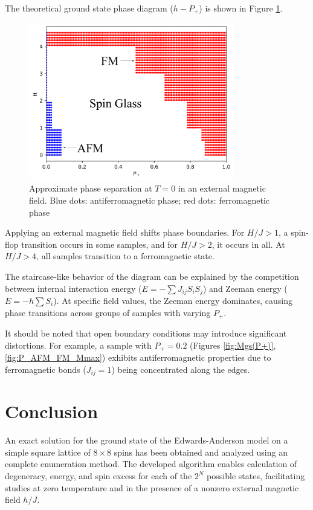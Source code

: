 \documentclass[utf8, babel, sor, jor, amsmath, amssymb, reprint]{elsarticle} %
\begin{document}
The theoretical ground state phase diagram ($h-P_+$) is shown in Figure \ref{fig:P+_afm_fm(H)}.

\begin{figure}[H]
	\centering
	\includegraphics[width=0.8\textwidth]{images/P+_afm_fm(H)_filled.png}
	\caption{Approximate phase separation at $T = 0$ in an external magnetic field. Blue dots: antiferromagnetic phase; red dots: ferromagnetic phase}
	\label{fig:P+_afm_fm(H)}
\end{figure}

Applying an external magnetic field shifts phase boundaries. For $H/J > 1$, a spin-flop transition occurs in some samples, and for $H/J > 2$, it occurs in all. At $H/J > 4$, all samples transition to a ferromagnetic state.

The staircase-like behavior of the diagram can be explained by the competition between internal interaction energy ($E = -\sum J_{ij} S_i S_j$) and Zeeman energy ($E = - h \sum S_i$). At specific field values, the Zeeman energy dominates, causing phase transitions across groups of samples with varying $P_+$.

It should be noted that open boundary conditions may introduce significant distortions. For example, a sample with $P_+ = 0.2$ (Figures \ref{fig:Mgs(P+)}, \ref{fig:P_AFM_FM_Mmax}) exhibits antiferromagnetic properties due to ferromagnetic bonds ($J_{ij} = 1$) being concentrated along the edges.

\section{Conclusion}

An exact solution for the ground state of the Edwards-Anderson model on a simple square lattice of $8 \times 8$ spins has been obtained and analyzed using an complete enumeration method. The developed algorithm enables calculation of degeneracy, energy, and spin excess for each of the $2^N$ possible states, facilitating studies at zero temperature and in the presence of a nonzero external magnetic field $h/J$.
\end{document}
